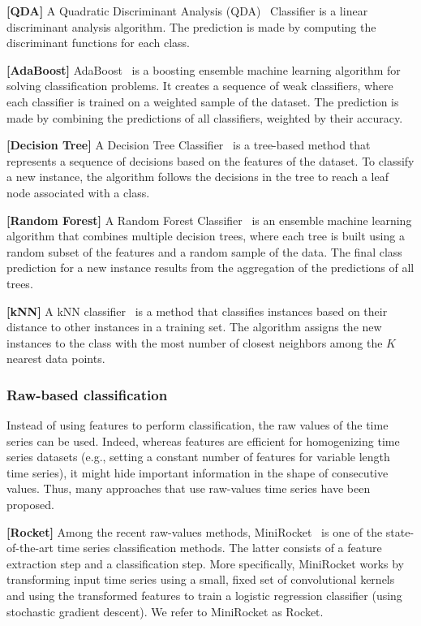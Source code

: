 \noindent\textbf{[QDA]}
A Quadratic Discriminant Analysis (QDA)~\cite{Geisser1964PosteriorOF} Classifier is a linear discriminant analysis algorithm. The prediction is made by computing the discriminant functions for each class.

\noindent\textbf{[AdaBoost]}
AdaBoost~\cite{10.5555/646943.712093} is a boosting ensemble machine learning algorithm for solving classification problems. It creates a sequence of weak classifiers, where each classifier is trained on a weighted sample of the dataset. The prediction is made by combining the predictions of all classifiers, weighted by their accuracy.

\noindent\textbf{[Decision Tree]}
A Decision Tree Classifier~\cite{Hunt1966ExperimentsII} is a tree-based method that represents a sequence of decisions based on the features of the dataset. To classify a new instance, the algorithm follows the decisions in the tree to reach a leaf node associated with a class.

\noindent\textbf{[Random Forest]}
A Random Forest Classifier~\cite{598994} is an ensemble machine learning algorithm that combines multiple decision trees, where each tree is built using a random subset of the features and a random sample of the data. The final class prediction for a new instance results from the aggregation of the predictions of all trees.

\noindent\textbf{[kNN]}
A kNN classifier~\cite{Fix1989DiscriminatoryA} is a method that classifies instances based on their distance to other instances in a training set. The algorithm assigns the new instances to the class with the most number of closest neighbors among the $K$ nearest data points. 

\vspace{-0.1cm}
\subsubsection{Raw-based classification}

Instead of using features to perform classification, the raw values of the time series can be used. Indeed, whereas features are efficient for homogenizing time series datasets (e.g., setting a constant number of features for variable length time series), it might hide important information in the shape of consecutive values. Thus, many approaches that use raw-values time series have been proposed.

\noindent\textbf{[Rocket]} Among the recent raw-values methods, MiniRocket~\cite{dempster2021minirocket} is one of the state-of-the-art time series classification methods. The latter consists of a feature extraction step and a classification step. More specifically, MiniRocket works by transforming input time series using a small, fixed set of convolutional kernels and using the transformed features to train a logistic regression classifier (using stochastic gradient descent). We refer to MiniRocket as Rocket.

